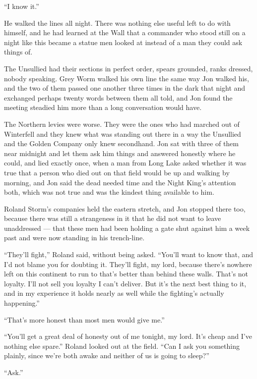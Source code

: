 “I know it.”

\sceneBreak

He walked the lines all night. There was nothing else useful left to do with himself, and he had learned at the Wall that a commander who stood still on a night like this became a statue men looked at instead of a man they could ask things of.

The Unsullied had their sections in perfect order, spears grounded, ranks dressed, nobody speaking. Grey Worm walked his own line the same way Jon walked his, and the two of them passed one another three times in the dark that night and exchanged perhaps twenty words between them all told, and Jon found the meeting steadied him more than a long conversation would have.

The Northern levies were worse. They were the ones who had marched out of Winterfell and they knew what was standing out there in a way the Unsullied and the Golden Company only knew secondhand. Jon sat with three of them near midnight and let them ask him things and answered honestly where he could, and lied exactly once, when a man from Long Lake asked whether it was true that a person who died out on that field would be up and walking by morning, and Jon said the dead needed time and the Night King’s attention both, which was not true and was the kindest thing available to him.

Roland Storm’s companies held the eastern stretch, and Jon stopped there too, because there was still a strangeness in it that he did not want to leave unaddressed — that these men had been holding a gate shut against him a week past and were now standing in his trench-line.

“They’ll fight,” Roland said, without being asked. “You’ll want to know that, and I’d not blame you for doubting it. They’ll fight, my lord, because there’s nowhere left on this continent to run to that’s better than behind these walls. That’s not loyalty. I’ll not sell you loyalty I can’t deliver. But it’s the next best thing to it, and in my experience it holds nearly as well while the fighting’s actually happening.”

“That’s more honest than most men would give me.”

“You’ll get a great deal of honesty out of me tonight, my lord. It’s cheap and I’ve nothing else spare.” Roland looked out at the field. “Can I ask you something plainly, since we’re both awake and neither of us is going to sleep?”

“Ask.”

